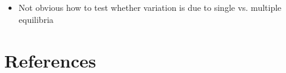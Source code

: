 \documentclass[blue]{beamer}
\begin{document}
{{\begin{itemize}
\begin{itemize}
\item {\footnotesize If patients are identical across areas, larger costs
with the same outcomes implies that expected utility could be increased
by reducing treatment intensity, regardless of whether variation is
caused by productivity spillovers/multiple equilibria or flat of the
curve \medskip{}
}{\footnotesize\par}
\item {\footnotesize If source of variation in intensity is patient heterogeneity,
we need }{\footnotesize\emph{more}}{\footnotesize{} specialization \medskip{}
}{\footnotesize\par}
\end{itemize}
\item {\footnotesize Not obvious how to test whether variation is due to
single vs. multiple equilibria }{\footnotesize\par}
\end{itemize}
}


\section{References}

\frame{ 

}}
\end{document}
